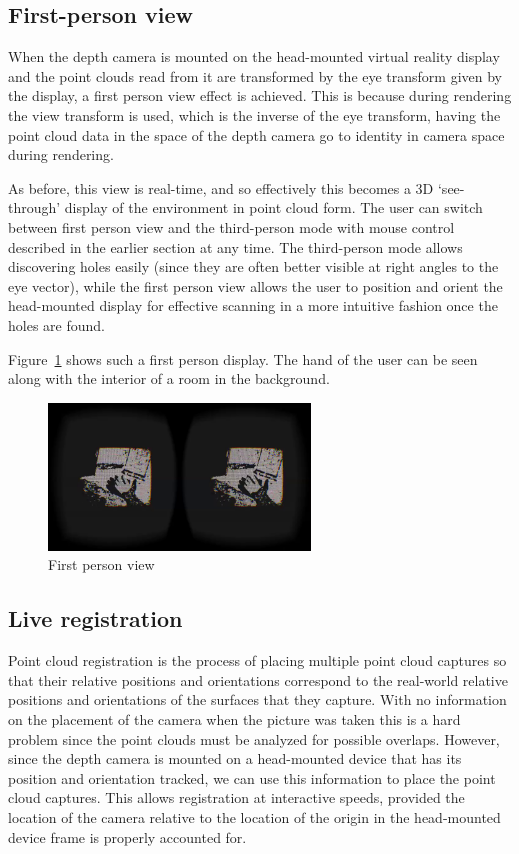 \documentclass[pageno]{jpaper}
\begin{document}
\subsection{First-person view}

When the depth camera is mounted on the head-mounted virtual reality display and
the point clouds read from it are transformed by the eye transform given by the
display, a first person view effect is achieved. This is because during
rendering the view transform is used, which is the inverse of the eye transform,
having the point cloud data in the space of the depth camera go to identity in
camera space during rendering.

As before, this view is real-time, and so effectively this becomes a 3D
`see-through' display of the environment in point cloud form. The user can
switch between first person view and the third-person mode with mouse control
described in the earlier section at any time. The third-person mode allows
discovering holes easily (since they are often better visible at right angles to
the eye vector), while the first person view allows the user to position and
orient the head-mounted display for effective scanning in a more intuitive
fashion once the holes are found.

Figure~\ref{fig:first-person-view} shows such a first person display. The hand
of the user can be seen along with the interior of a room in the background.

\begin{figure}
  \centering
    \includegraphics[width=0.62\textwidth]{shot1.png}
  \caption{First person view}
  \label{fig:first-person-view}
\end{figure}

\subsection{Live registration}

Point cloud registration is the process of placing multiple point cloud captures
so that their relative positions and orientations correspond to the real-world
relative positions and orientations of the surfaces that they capture. With no
information on the placement of the camera when the picture was taken this is a
hard problem since the point clouds must be analyzed for possible
overlaps. However, since the depth camera is mounted on a head-mounted device
that has its position and orientation tracked, we can use this information to
place the point cloud captures. This allows registration at interactive speeds,
provided the location of the camera relative to the location of the origin in
the head-mounted device frame is properly accounted for.
\end{document}
